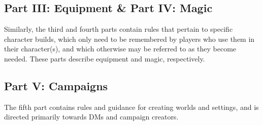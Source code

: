 \subsection{Part III: Equipment \& Part IV: Magic}
Similarly, the third and fourth parts contain rules that pertain to
specific character builds, which only need to be remembered by players
who use them in their character(s),
and which otherwise may be referred to as they become needed. 
These parts describe equipment and magic, respectively.

\subsection{Part V: Campaigns}
The fifth part contains rules and guidance for creating worlds and settings,
and is directed primarily towards DMs and campaign creators.

